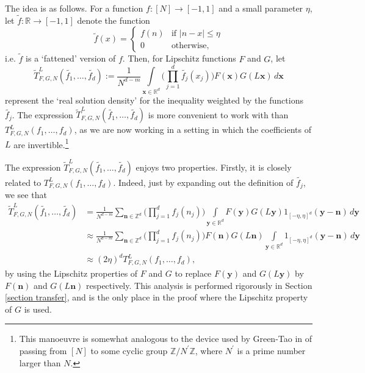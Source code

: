 \documentclass[12pt,a4paper,twoside,reqno]{amsart}
\numberwithin{equation}{section}
\begin{document}
The idea is as follows. For a function $f: [N] \longrightarrow [-1,1]$ and a small parameter $\eta$, let $\widetilde{f}: \mathbb{R} \longrightarrow [-1,1]$ denote the function \[ \widetilde{f}(x) = \begin{cases}
f(n) & \text{if } \vert n-x\vert \leqslant \eta \\
0 & \text{otherwise,} \end{cases} \] i.e. $\widetilde{f}$ is a `fattened' version of $f$. Then, for Lipschitz functions $F$ and $G$, let \[\widetilde{T}_{F,G,N}^L(\widetilde{f_1},\dots,\widetilde{f_d}) :=  \frac{1}{N^{d-m}} \int\limits_{\mathbf{x} \in \mathbb{R}^d} \Big(\prod\limits_{j=1}^d \widetilde{f_j} (x_j)\Big) F(\mathbf{x}) G(L\mathbf{x})\, d \mathbf{x}\] represent the `real solution density' for the inequality weighted by the functions $\widetilde{f_j}$. The expression $\widetilde{T}_{F,G,N}^L(\widetilde{f_1},\dots,\widetilde{f_d})$ is more convenient to work with than $T_{F,G,N}^L(f_1,\dots,f_d)$, as we are now working in a setting in which the coefficients of $L$ are invertible.\footnote{This manoeuvre is somewhat analogous to the device used by Green-Tao in \cite{GT10} of passing from $[N]$ to some cyclic group $\mathbb{Z}/N^\prime \mathbb{Z}$, where $N^\prime$ is a prime number larger than $N$. }

The expression $\widetilde{T}_{F,G,N}^L(\widetilde{f_1},\dots,\widetilde{f_d})$ enjoys two properties. Firstly, it is closely related to $T_{F,G,N}^L(f_1,\dots,f_d)$. Indeed, just by expanding out the definition of $\widetilde{f_j}$, we see that
\begin{align}
\label{Lipschitz is needed equation}
\widetilde{T}_{F,G,N}^L(\widetilde{f_1},\dots,\widetilde{f_d}) &= \frac{1}{N^{d-m}} \sum\limits_{ \mathbf{n} \in \mathbb{Z}^d} \Big(\prod\limits_{j=1}^d f_j(n_j)\Big) \int\limits_{\mathbf{y} \in \mathbb{R}^d} F(\mathbf{y}) G(L\mathbf{y}) 1_{[-\eta,\eta]^d}(\mathbf{y} - \mathbf{n}) \, d\mathbf{y} \nonumber \\ &\approx \frac{1}{N^{d-m}} \sum\limits_{ \mathbf{n} \in \mathbb{Z}^d} \Big(\prod\limits_{j=1}^d f_j(n_j)\Big) F(\mathbf{n}) G(L\mathbf{n}) \int\limits_{\mathbf{y} \in \mathbb{R}^d} 1_{[-\eta,\eta]^d}(\mathbf{y} - \mathbf{n}) \, d\mathbf{y} \nonumber \\
& \approx (2 \eta)^dT_{F,G,N}^L(f_1,\dots,f_d),
 \end{align}
 \noindent by using the Lipschitz properties of $F$ and $G$ to replace $F(\mathbf{y})$ and $G(L\mathbf{y})$ by $F(\mathbf{n})$ and $G(L\mathbf{n})$ respectively. This analysis is performed rigorously in Section \ref{section transfer}, and is the only place in the proof where the Lipschitz property of $G$ is used. 
 
\end{document}
